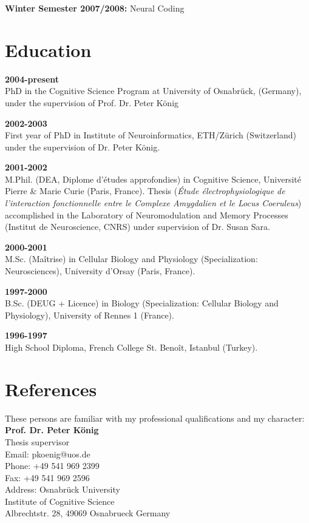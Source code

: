 \textbf{Winter Semester 2007/2008:} Neural Coding

\section*{Education}
\textbf{2004-present}\\ 
PhD in the Cognitive Science Program at University of
Osnabr\"uck, (Germany), under the supervision of Prof. Dr. Peter K\"onig

\textbf{2002-2003}\\
First year of PhD in Institute of Neuroinformatics,
ETH/Z\"urich (Switzerland) under the supervision of Dr. Peter K\"onig.  

\textbf{2001-2002}\\
M.Phil. (DEA, Diplome d'\'etudes approfondies) in Cognitive Science,
Universit\'e Pierre \& Marie Curie (Paris, France). Thesis (\textit{\'Etude
\'electrophysiologique de l'interaction fonctionnelle entre le Complexe
Amygdalien et le Locus Coeruleus}) accomplished in the Laboratory of
Neuromodulation and Memory Processes (Institut de Neuroscience, CNRS) under
supervision of Dr. Susan Sara.  

\textbf{2000-2001}\\
M.Sc. (Ma\^itrise) in Cellular Biology and Physiology (Specialization:
Neurosciences), University d'Orsay (Paris, France).

\textbf{1997-2000}\\ 
B.Sc. (DEUG + Licence) in  Biology (Specialization: Cellular Biology and
Physiology), University of Rennes 1 (France).


\textbf{1996-1997}\\ 
High School Diploma, French College St. Beno\^it, Istanbul (Turkey).


\section*{References}

\noindent These persons are familiar with my professional qualifications and my character:
\\

\textbf{Prof. Dr. Peter K\"onig } \\
Thesis supervisor \\
Email:  pkoenig@uos.de \\ 
Phone:  +49 541 969 2399 \\
Fax:    +49 541 969 2596 \\
Address: Osnabr\"uck University \\
Institute of Cognitive Science \\
Albrechtstr. 28, 49069  Osnabrueck Germany \\

